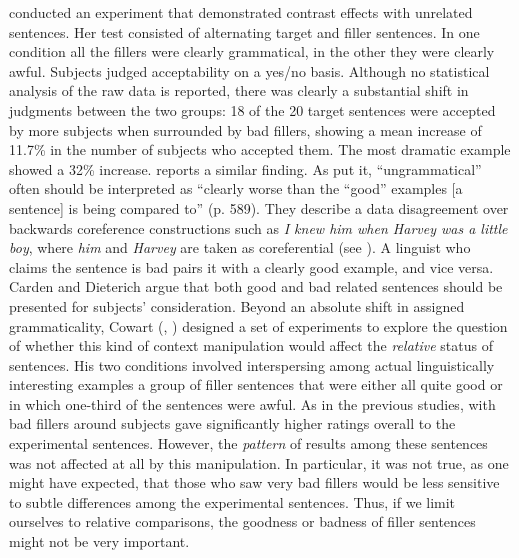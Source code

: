 \citet{Snow1975} conducted an experiment that demonstrated contrast effects with unrelated sentences. Her test consisted of alternating target and filler sentences. In one condition all the fillers were clearly grammatical, in the other they were clearly awful. Subjects judged acceptability on a yes/no basis. Although no statistical analysis of the raw data is reported, there was clearly a substantial shift in judgments between the two groups: 18 of the 20 target sentences were accepted by more subjects when surrounded by bad fillers, showing a mean increase of 11.7\% in the number of subjects who accepted them. The most dramatic example showed a 32\% increase. \citet{Nagata1992} reports a similar finding. As \citet{CardenEtAl1981} put it, ``ungrammatical'' often should be interpreted as ``clearly worse than the ``good'' examples [a sentence] is being compared to'' (p. 589).
They describe a data disagreement over backwards coreference constructions such as \textit{I knew him when Harvey was a little boy}, where \textit{him} and \textit{Harvey} are taken as coreferential (see ). A linguist who claims the sentence is bad pairs it with a clearly good example, and vice versa. Carden and Dieterich argue that both good and bad related sentences should be presented for subjects' consideration. Beyond an absolute shift in assigned grammaticality, Cowart (\citeyear{Cowart1994}, \citeyear[22--27]{Cowart1997}) designed a
set of experiments to explore the question of whether this kind of context manipulation would affect the \textit{relative} status of sentences. His two conditions involved interspersing among actual linguistically interesting examples a group of
filler sentences that were either all quite good or in which one-third of the sentences were awful. As in the previous studies, with bad fillers around subjects gave significantly higher ratings overall to the experimental sentences. However, the \textit{pattern} of results among these sentences was not affected at all by this manipulation. In particular, it was not true, as one might have expected, that those who saw very bad fillers would be less sensitive to subtle differences among the experimental sentences. Thus, if we limit ourselves to relative comparisons, the goodness or badness of filler sentences might not be very important.


